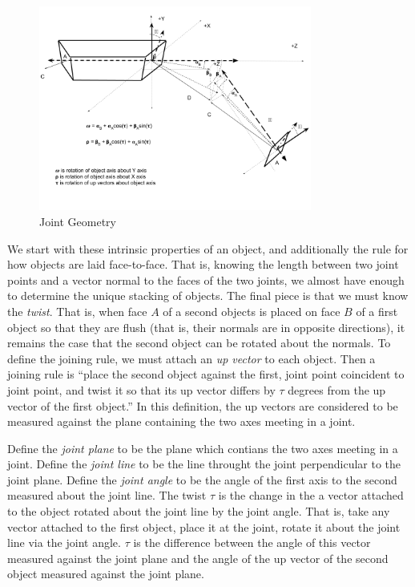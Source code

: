 \documentclass[11pt]{article}
\begin{document}
{\begin{figure}
     \centering
     \includegraphics[width=0.80\textwidth]{figures/JointGeometry.png}
     \caption{Joint Geometry}
  \label{fig:jointdiagram}
\end{figure}


We start with these intrinsic properties of an object, and additionally the
rule for how objects are laid face-to-face. That is, knowing the length between two
joint points and a vector normal to the faces of the two joints, we almost have
enough to determine the unique stacking of objects. The final piece is that we must
know the {\em twist}. That is, when face $A$ of a second objects is placed on face $B$
of a first object so that they are flush (that is, their normals are in opposite directions),
it remains the case that the second object can be rotated about the normals. To
define the joining rule, we must attach an {\em up vector} to each object. Then a joining
rule is ``place the second object against the first, joint point coincident to joint point,
and twist it so that its up vector differs by $\tau$ degrees from the up vector of the first
object.'' In this definition, the up vectors are considered to be measured against the plane
containing the two axes meeting in a joint.

Define the {\em joint plane} to be the plane which contians the two axes meeting in a joint.
Define the {\em joint line} to be the line throught the joint perpendicular to the joint plane.
Define the {\em joint angle} to be the angle of the first axis to the second measured about
the joint line.
The twist $\tau$ is the change in the a vector attached to the object rotated about the joint
line by the joint angle. That is, take any vector attached to the first object, place it at
the joint, rotate it about the joint line via the joint angle. $\tau$ is the difference
between the angle of this vector measured against the joint plane and the angle of the
up vector of the second object measured against the joint plane.

}
\end{document}
